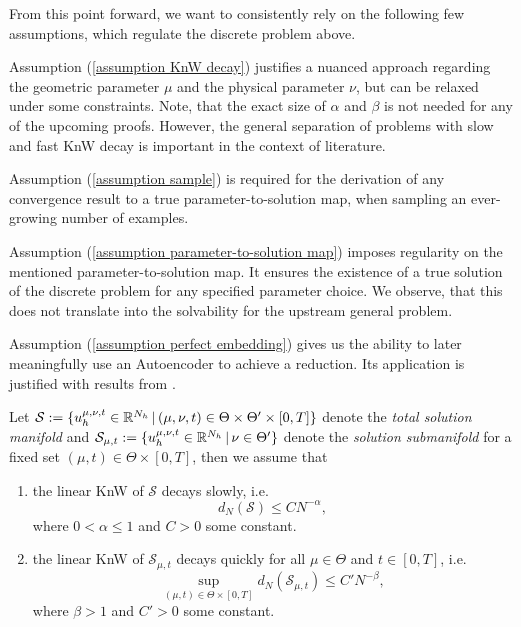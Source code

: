 From this point forward, we want to consistently rely on the following few assumptions, which regulate the 
discrete problem above. 

Assumption (\ref{assumption KnW decay}) justifies a nuanced approach regarding the
geometric parameter $\mu$ and the physical parameter $\nu$, but can be relaxed
under some constraints. Note, that the exact size of $\alpha$ and $\beta$ is not needed for any
of the upcoming proofs. However, the general separation of problems with slow and fast KnW decay is important
in the context of literature.

Assumption (\ref{assumption sample}) is required
for the derivation of any convergence result to a true parameter-to-solution map, 
when sampling an ever-growing number of examples. 

Assumption (\ref{assumption parameter-to-solution map})
imposes regularity on the mentioned parameter-to-solution map. It ensures
the existence of a true solution of the discrete problem for any specified parameter choice. We observe, that
this does not translate into the solvability for the upstream general problem.

Assumption (\ref{assumption perfect embedding}) gives us the ability to later meaningfully 
use an Autoencoder to achieve a reduction. Its application is justified with results from \cite{franco2023}.


\begin{assumption} \label{assumption KnW decay}
    Let $\mathcal{S} := \{ u_h^{\mu, \nu, t} \in \mathbb{R}^{N_h} \, \vert \, (\mu, \nu, t) \in \Theta \times \Theta' \times [0, T] \}$ 
    denote the \emph{total solution manifold} and $\mathcal{S}_{\mu, t} := 
    \{ u_h^{\mu, \nu, t} \in \mathbb{R}^{N_h} \, \vert \, \nu \in \Theta' \}$ denote the \emph{solution 
    submanifold} for a fixed set $(\mu, t) \in \Theta \times [0, T]$, then we assume that
    \begin{enumerate}
        \item the linear KnW of $\mathcal{S}$ decays slowly, i.e. 
        \begin{equation*}
            d_N(\mathcal{S}) \leq C N^{-\alpha},
        \end{equation*}
        where $0 < \alpha \leq 1$ and $C > 0$ some constant.
        \item the linear KnW of $\mathcal{S}_{\mu, t}$ decays quickly for all $\mu \in \Theta$ and $t \in [0, T]$, i.e. 
        \begin{equation*}
            \sup_{(\mu, t) \in \Theta \times [0, T]} d_N(\mathcal{S}_{\mu, t}) \leq C' N^{-\beta},    
        \end{equation*}
        where $\beta > 1$ and $C' > 0$ some constant.
    \end{enumerate}
\end{assumption}

